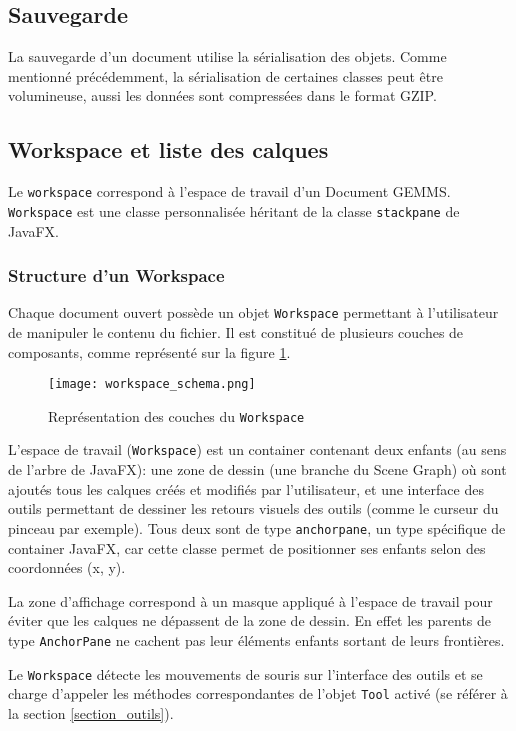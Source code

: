 \subsection{Sauvegarde}
La sauvegarde d'un document utilise la sérialisation des objets. Comme mentionné précédemment, la sérialisation de certaines classes peut être volumineuse, aussi les données sont compressées dans le format GZIP.

\subsection{Workspace et liste des calques}
Le \texttt{\gls{workspace}} correspond à l'espace de travail d'un Document GEMMS. \texttt{Workspace} est une classe personnalisée héritant de la classe \texttt{\gls{stackpane}} de JavaFX. 

\subsubsection{Structure d'un Workspace}
\label{sec:structure_workspace}
Chaque document ouvert possède un objet \texttt{Workspace} permettant à l'utilisateur de manipuler le contenu du fichier. Il est constitué de plusieurs couches de composants, comme représenté sur la figure \ref{fig:workspace_representation}.


\begin{figure}[!ht]
	\caption{Représentation des couches du \texttt{Workspace}}
	\centering
	\texttt{[image: workspace\_schema.png]}
	\label{fig:workspace_representation}
\end{figure}

L'espace de travail (\texttt{Workspace}) est un container contenant deux enfants (au sens de l'arbre de JavaFX): une zone de dessin (une branche du Scene Graph) où sont ajoutés tous les calques créés et modifiés par l'utilisateur, et une interface des outils permettant de dessiner les retours visuels des outils (comme le curseur du pinceau par exemple). Tous deux sont de type \texttt{\gls{anchorpane}}, un type spécifique de container JavaFX, car cette classe permet de positionner ses enfants selon des coordonnées (x, y).

La zone d'affichage correspond à un masque appliqué à l'espace de travail pour éviter que les calques ne dépassent de la zone de dessin. En effet les parents de type \texttt{AnchorPane} ne cachent pas leur éléments enfants sortant de leurs frontières.

Le \texttt{Workspace} détecte les mouvements de souris sur l'interface des outils et se charge d'appeler les méthodes correspondantes de l'objet \texttt{Tool} activé (se référer à la section \ref{section_outils}).

